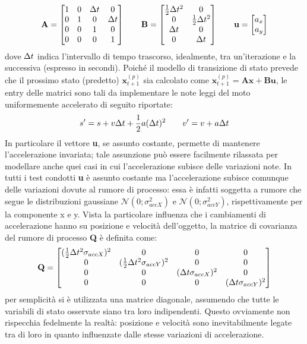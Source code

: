 \begin{equation*}
\textbf{A} = 
\begin{bmatrix}
1 & 0 & \Delta t & 0 \\
0 & 1 & 0 & \Delta t \\
0 & 0 & 1 & 0 \\
0 & 0 & 0 & 1 \\
\end{bmatrix}
\qquad 
\textbf{B} = 
\begin{bmatrix}
\frac{1}{2}\Delta t^2 & 0\\
0 & \frac{1}{2}\Delta t^2\\
\Delta t & 0 \\
0 & \Delta t \\
\end{bmatrix}
\qquad 
\textbf{u} = 
\begin{bmatrix}
a_x \\
a_y \\
\end{bmatrix}
\end{equation*}
dove $\Delta t$ indica l'intervallo di tempo trascorso, idealmente, tra un'iterazione e la successiva (espresso in secondi). Poiché il modello di transizione di stato prevede che il prossimo stato (predetto) $\textbf{x}^{(p)}_{t+1}$ sia calcolato come $\textbf{x}^{(p)}_{t+1} = \textbf{Ax}+ \textbf{Bu}$, le entry delle  matrici sono tali da implementare le note leggi del moto uniformemente accelerato di seguito riportate:
\begin{equation*}
s' = s + v \Delta t + \frac{1}{2}a(\Delta t)^2  \qquad v' = v + a \Delta t
\end{equation*}
In particolare il vettore \textbf{u}, se assunto costante, permette di mantenere l'accelerazione invariata; tale assunzione può essere facilmente rilassata per modellare anche quei casi in cui l'accelerazione subisce delle variazioni note. In tutti i test condotti \textbf{u} è assunto costante ma l'accelerazione subisce comunque delle variazioni dovute al rumore di processo: essa è infatti soggetta a rumore che segue le distribuzioni gaussiane $\mathcal{N}(0; \sigma^2_{accX})$ e $\mathcal{N}(0; \sigma^2_{accY})$, rispettivamente per la componente x e y. Vista la particolare influenza che i cambiamenti di accelerazione hanno su posizione e velocità dell'oggetto, la matrice di covarianza del rumore di processo \textbf{Q} è definita come:
\begin{equation*}
\textbf{Q} = 
\begin{bmatrix}
(\frac{1}{2} \Delta t^2 \sigma_{accX})^2 & 0 & 0 & 0 \\
0 & (\frac{1}{2} \Delta t^2 \sigma_{accY})^2 & 0 & 0 \\
0 & 0 & (\Delta t \sigma_{accX})^2 & 0 \\
0 & 0 & 0 & (\Delta t \sigma_{accY})^2 \\
\end{bmatrix}
\end{equation*}
per semplicità si è utilizzata una matrice diagonale, assumendo che tutte le variabili di stato osservate siano tra loro indipendenti. Questo ovviamente non rispecchia fedelmente la realtà: posizione e velocità sono inevitabilmente legate tra di loro in quanto influenzate dalle stesse variazioni di accelerazione.

